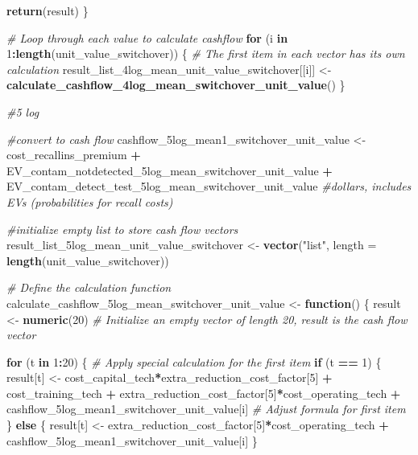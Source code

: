 \documentclass[
]{article}
\newenvironment{Shaded}{\begin{snugshade}}{\end{snugshade}}
\newcommand{\AttributeTok}[1]{\textcolor[rgb]{0.13,0.29,0.53}{#1}}
\newcommand{\CommentTok}[1]{\textcolor[rgb]{0.56,0.35,0.01}{\textit{#1}}}
\newcommand{\ControlFlowTok}[1]{\textcolor[rgb]{0.13,0.29,0.53}{\textbf{#1}}}
\newcommand{\DecValTok}[1]{\textcolor[rgb]{0.00,0.00,0.81}{#1}}
\newcommand{\FunctionTok}[1]{\textcolor[rgb]{0.13,0.29,0.53}{\textbf{#1}}}
\newcommand{\NormalTok}[1]{#1}
\newcommand{\OtherTok}[1]{\textcolor[rgb]{0.56,0.35,0.01}{#1}}
\newcommand{\SpecialCharTok}[1]{\textcolor[rgb]{0.81,0.36,0.00}{\textbf{#1}}}
\newcommand{\StringTok}[1]{\textcolor[rgb]{0.31,0.60,0.02}{#1}}
\begin{document}
\begin{Shaded}
\begin{Highlighting}[]
  \FunctionTok{return}\NormalTok{(result)}
\NormalTok{\}}

\CommentTok{\# Loop through each value to calculate cashflow}
\ControlFlowTok{for}\NormalTok{ (i }\ControlFlowTok{in} \DecValTok{1}\SpecialCharTok{:}\FunctionTok{length}\NormalTok{(unit\_value\_switchover)) \{}
  \CommentTok{\# The first item in each vector has its own calculation}
\NormalTok{  result\_list\_4log\_mean\_unit\_value\_switchover[[i]] }\OtherTok{\textless{}{-}} \FunctionTok{calculate\_cashflow\_4log\_mean\_switchover\_unit\_value}\NormalTok{()}
\NormalTok{\}}


\CommentTok{\#5 log }

\CommentTok{\#convert to cash flow}
\NormalTok{cashflow\_5log\_mean1\_switchover\_unit\_value }\OtherTok{\textless{}{-}}\NormalTok{ cost\_recallins\_premium }\SpecialCharTok{+}\NormalTok{ EV\_contam\_notdetected\_5log\_mean\_switchover\_unit\_value }\SpecialCharTok{+}\NormalTok{ EV\_contam\_detect\_test\_5log\_mean\_switchover\_unit\_value }\CommentTok{\#dollars, includes EVs (probabilities for recall costs)}


\CommentTok{\#initialize empty list to store cash flow vectors}
\NormalTok{result\_list\_5log\_mean\_unit\_value\_switchover }\OtherTok{\textless{}{-}} \FunctionTok{vector}\NormalTok{(}\StringTok{"list"}\NormalTok{, }\AttributeTok{length =} \FunctionTok{length}\NormalTok{(unit\_value\_switchover))}


\CommentTok{\# Define the calculation function}
\NormalTok{calculate\_cashflow\_5log\_mean\_switchover\_unit\_value }\OtherTok{\textless{}{-}} \ControlFlowTok{function}\NormalTok{() \{}
\NormalTok{  result }\OtherTok{\textless{}{-}} \FunctionTok{numeric}\NormalTok{(}\DecValTok{20}\NormalTok{)  }\CommentTok{\# Initialize an empty vector of length 20, result is the cash flow vector}
  
  \ControlFlowTok{for}\NormalTok{ (t }\ControlFlowTok{in} \DecValTok{1}\SpecialCharTok{:}\DecValTok{20}\NormalTok{) \{}
    \CommentTok{\# Apply special calculation for the first item}
    \ControlFlowTok{if}\NormalTok{ (t }\SpecialCharTok{==} \DecValTok{1}\NormalTok{) \{}
\NormalTok{      result[t] }\OtherTok{\textless{}{-}}\NormalTok{ cost\_capital\_tech}\SpecialCharTok{*}\NormalTok{extra\_reduction\_cost\_factor[}\DecValTok{5}\NormalTok{] }\SpecialCharTok{+}\NormalTok{ cost\_training\_tech }\SpecialCharTok{+}\NormalTok{ extra\_reduction\_cost\_factor[}\DecValTok{5}\NormalTok{]}\SpecialCharTok{*}\NormalTok{cost\_operating\_tech }\SpecialCharTok{+}\NormalTok{ cashflow\_5log\_mean1\_switchover\_unit\_value[i] }\CommentTok{\# Adjust formula for first item}
\NormalTok{    \} }\ControlFlowTok{else}\NormalTok{ \{}
\NormalTok{      result[t] }\OtherTok{\textless{}{-}}\NormalTok{ extra\_reduction\_cost\_factor[}\DecValTok{5}\NormalTok{]}\SpecialCharTok{*}\NormalTok{cost\_operating\_tech }\SpecialCharTok{+}\NormalTok{ cashflow\_5log\_mean1\_switchover\_unit\_value[i]}
\NormalTok{    \}}
    

\end{Highlighting}
\end{Shaded}
\end{document}
